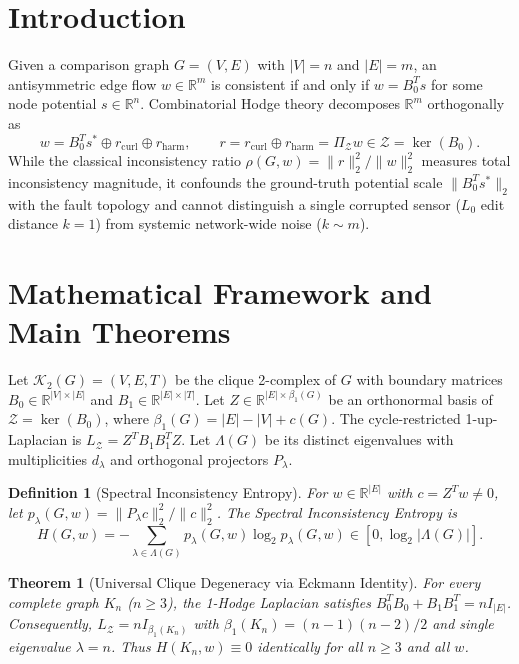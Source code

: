 \documentclass[11pt,a4paper]{article}
\newtheorem{theorem}{Theorem}
\newtheorem{definition}{Definition}
\begin{document}
\section{Introduction}
Given a comparison graph $G=(V,E)$ with $|V|=n$ and $|E|=m$, an antisymmetric edge flow $w \in \mathbb{R}^m$ is consistent if and only if $w = B_0^T s$ for some node potential $s \in \mathbb{R}^n$. Combinatorial Hodge theory \cite{jiang2011} decomposes $\mathbb{R}^m$ orthogonally as
\[
w = B_0^T s^* \oplus r_{\mathrm{curl}} \oplus r_{\mathrm{harm}}, \qquad r = r_{\mathrm{curl}} \oplus r_{\mathrm{harm}} = \Pi_{\mathcal{Z}} w \in \mathcal{Z} = \ker(B_0).
\]
While the classical inconsistency ratio $\rho(G,w) = \|r\|_2^2 / \|w\|_2^2$ measures total inconsistency magnitude, it confounds the ground-truth potential scale $\|B_0^T s^*\|_2$ with the fault topology and cannot distinguish a single corrupted sensor ($L_0$ edit distance $k=1$) from systemic network-wide noise ($k \sim m$).

\section{Mathematical Framework and Main Theorems}
Let $\mathcal{K}_2(G) = (V, E, T)$ be the clique 2-complex of $G$ with boundary matrices $B_0 \in \mathbb{R}^{|V|\times |E|}$ and $B_1 \in \mathbb{R}^{|E|\times |T|}$. Let $Z \in \mathbb{R}^{|E| \times \beta_1(G)}$ be an orthonormal basis of $\mathcal{Z} = \ker(B_0)$, where $\beta_1(G) = |E| - |V| + c(G)$. The cycle-restricted 1-up-Laplacian is $L_{\mathcal{Z}} = Z^T B_1 B_1^T Z$. Let $\Lambda(G)$ be its distinct eigenvalues with multiplicities $d_\lambda$ and orthogonal projectors $P_\lambda$.

\begin{definition}[Spectral Inconsistency Entropy]
For $w \in \mathbb{R}^{|E|}$ with $c = Z^T w \neq 0$, let $p_\lambda(G,w) = \|P_\lambda c\|_2^2 / \|c\|_2^2$. The Spectral Inconsistency Entropy is
\[
H(G, w) = -\sum_{\lambda \in \Lambda(G)} p_\lambda(G,w) \log_2 p_\lambda(G,w) \in [0, \log_2 |\Lambda(G)|].
\]
\end{definition}

\begin{theorem}[Universal Clique Degeneracy via Eckmann Identity]
For every complete graph $K_n$ ($n \ge 3$), the 1-Hodge Laplacian satisfies $B_0^T B_0 + B_1 B_1^T = n I_{|E|}$. Consequently, $L_{\mathcal{Z}} = n I_{\beta_1(K_n)}$ with $\beta_1(K_n) = (n-1)(n-2)/2$ and single eigenvalue $\lambda = n$. Thus $H(K_n, w) \equiv 0$ identically for all $n \ge 3$ and all $w$.
\end{theorem}
\end{document}
